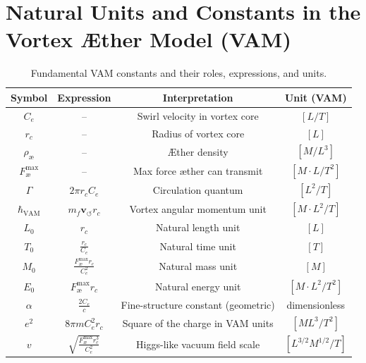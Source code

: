 \documentclass[12pt]{article}
\begin{document}
\section{Natural Units and Constants in the Vortex Æther Model (VAM)}
\renewcommand{\arraystretch}{1.3}
\begin{table}[H]
    \centering
    \footnotesize
    \caption{Fundamental VAM constants and their roles, expressions, and units.}
    \begin{tabular}{|c|c|c|c|}
        \hline
        \textbf{Symbol} & \textbf{Expression} & \textbf{Interpretation} & \textbf{Unit (VAM)} \\
        \hline
        $C_e$ & -- & Swirl velocity in vortex core & $[L/T]$ \\
        \hline
        $r_c$ & -- & Radius of vortex core & $[L]$ \\
        \hline
        $\rho_\text{\ae}$ & -- & Æther density & $[M/L^3]$ \\
        \hline
        $F^{\text{max}}_{\text{\ae}}$ & -- & Max force æther can transmit & $[M \cdot L / T^2]$ \\
        \hline
        $\Gamma$ & $2\pi r_c C_e$ & Circulation quantum & $[L^2 / T]$ \\
        \hline
        $\hbar_\text{VAM}$ & $m_f \mathbf{v}_{\scriptscriptstyle\boldsymbol{\circlearrowleft}} r_c$ & Vortex angular momentum unit & $[M \cdot L^2 / T]$ \\
        \hline
        $L_0$ & $r_c$ & Natural length unit & $[L]$ \\
        \hline
        $T_0$ & $\frac{r_c}{C_e}$ & Natural time unit & $[T]$ \\
        \hline
        $M_0$ & $\frac{F^{\text{max}}_{\text{\ae}} r_c}{C_e^2}$ & Natural mass unit & $[M]$ \\
        \hline
        $E_0$ & $F^{\text{max}}_{\text{\ae}} r_c$ & Natural energy unit & $[M \cdot L^2 / T^2]$ \\
        \hline
        $\alpha$ & $\frac{2 C_e}{c}$ & Fine-structure constant (geometric) & dimensionless \\
        \hline
        $e^2$ & $8\pi m C_e^2 r_c$ & Square of the charge in VAM units & $[M L^3 / T^2]$ \\
        \hline
        $v$ & $\sqrt{\frac{F^{\text{max}}_{\text{\ae}} r_c^3}{C_e^2}}$ & Higgs-like vacuum field scale & $[L^{3/2} M^{1/2} / T]$ \\
        \hline
    \end{tabular}
    \label{tab:VAM_constants_summary}
\end{table}
\end{document}
